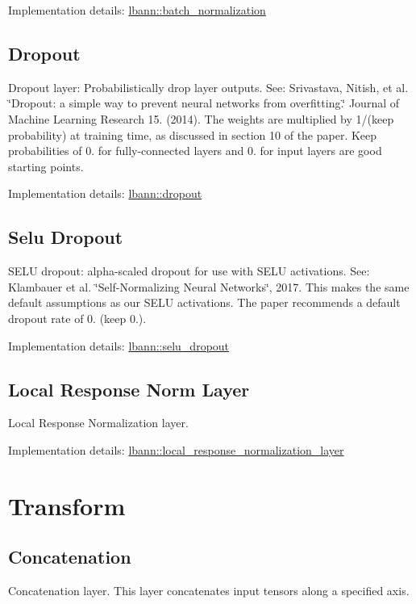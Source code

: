 Implementation details\+: \hyperlink{classlbann_1_1batch__normalization}{lbann\+::batch\+\_\+normalization}\hypertarget{layers_dropout}{}\subsection{Dropout}\label{layers_dropout}
Dropout layer\+: Probabilistically drop layer outputs. See\+: Srivastava, Nitish, et al. \char`\"{}\+Dropout\+: a simple way to prevent
  neural networks from overfitting.\char`\"{} Journal of Machine Learning Research 15. (2014). The weights are multiplied by 1/(keep probability) at training time, as discussed in section 10 of the paper. Keep probabilities of 0. for fully-\/connected layers and 0. for input layers are good starting points.

Implementation details\+: \hyperlink{classlbann_1_1dropout}{lbann\+::dropout}\hypertarget{layers_selu_dropout}{}\subsection{Selu Dropout}\label{layers_selu_dropout}
S\+E\+LU dropout\+: alpha-\/scaled dropout for use with S\+E\+LU activations. See\+: Klambauer et al. \char`\"{}\+Self-\/\+Normalizing Neural Networks\char`\"{}, 2017. This makes the same default assumptions as our S\+E\+LU activations. The paper recommends a default dropout rate of 0. (keep 0.).

Implementation details\+: \hyperlink{classlbann_1_1selu__dropout}{lbann\+::selu\+\_\+dropout}\hypertarget{layers_local_response_norm_layer}{}\subsection{Local Response Norm Layer}\label{layers_local_response_norm_layer}
Local Response Normalization layer.

Implementation details\+: \hyperlink{classlbann_1_1local__response__normalization__layer}{lbann\+::local\+\_\+response\+\_\+normalization\+\_\+layer}\hypertarget{layers_transform}{}\section{Transform}\label{layers_transform}
\hypertarget{layers_concatenation}{}\subsection{Concatenation}\label{layers_concatenation}
Concatenation layer. This layer concatenates input tensors along a specified axis.

